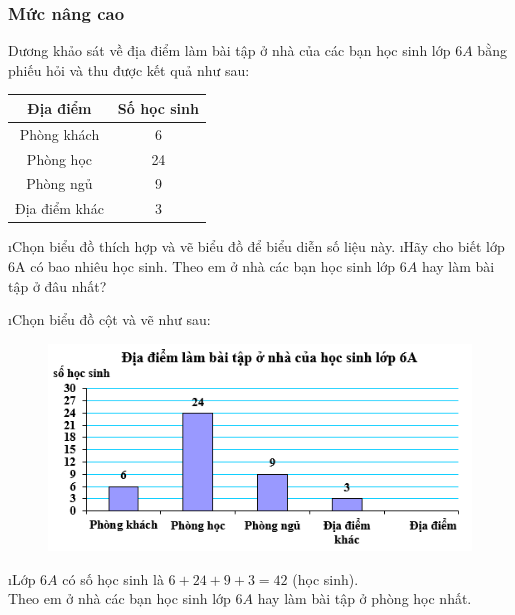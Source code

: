 \subsubsection*{Mức nâng cao}
\begin{bt}
	Dương khảo sát về địa điểm làm bài tập ở nhà của các bạn học sinh lớp $6A$ bằng phiếu hỏi và thu được kết quả như sau:
	\begin{center}
		\begin{tabular}{|c|c|}
			\hline
			Địa điểm&	Số học sinh\\
			\hline
			Phòng khách& 6 \\
			\hline	 
			Phòng học	&  24 \\
			\hline
			Phòng ngủ	 & 9 \\
			\hline
			Địa điểm khác&	 3 \\
			\hline
		\end{tabular}
	\end{center}
	\begin{enumerate}[a),leftmargin=*]
		\i Chọn biểu đồ thích hợp và vẽ biểu đồ để biểu diễn số liệu này.
		\i Hãy cho biết lớp 6A có bao nhiêu học sinh. Theo em ở nhà các bạn học sinh lớp $6A$ hay làm bài tập ở đâu nhất?
	\end{enumerate}
	\begin{loigiaichuong40}
		\begin{enumerate}[a),leftmargin=*]
			\i Chọn biểu đồ cột và vẽ như sau:
			\begin{figure}[H]
				\centering
				\vspace*{-5pt}
				\captionsetup{labelformat= empty, justification=centering}
				\includegraphics[width=0.5\linewidth]{13}
				\vspace*{-10pt}
			\end{figure}
			\i Lớp $6A$ có số học sinh là $6 + 24 + 9 + 3 = 42$  (học sinh).\\
			Theo em ở nhà các bạn học sinh lớp $6A$ hay làm bài tập ở phòng học nhất.
		\end{enumerate}
	\end{loigiaichuong40}
\end{bt}
